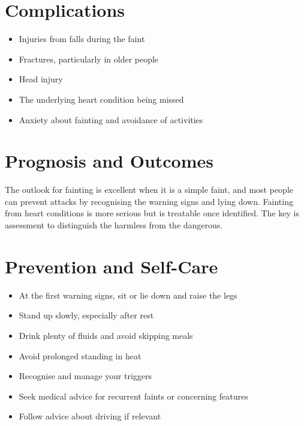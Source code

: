 \section*{Complications}
\begin{itemize}
    \item Injuries from falls during the faint
    \item Fractures, particularly in older people
    \item Head injury
    \item The underlying heart condition being missed
    \item Anxiety about fainting and avoidance of activities
\end{itemize}

\section*{Prognosis and Outcomes}
The outlook for fainting is excellent when it is a simple faint, and most people can prevent attacks by recognising the warning signs and lying down. Fainting from heart conditions is more serious but is treatable once identified. The key is assessment to distinguish the harmless from the dangerous.

\section*{Prevention and Self-Care}
\begin{itemize}
    \item At the first warning signs, sit or lie down and raise the legs
    \item Stand up slowly, especially after rest
    \item Drink plenty of fluids and avoid skipping meals
    \item Avoid prolonged standing in heat
    \item Recognise and manage your triggers
    \item Seek medical advice for recurrent faints or concerning features
    \item Follow advice about driving if relevant
\end{itemize}

